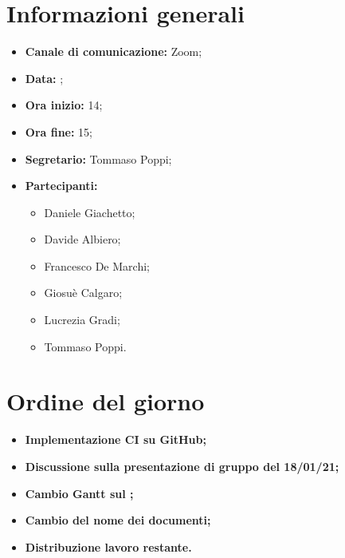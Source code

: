 \section{Informazioni generali}

\begin{itemize}

	\item \textbf{Canale di comunicazione:} Zoom;
	
	\item \textbf{Data:} \DataMeeting{};
	
	\item \textbf{Ora inizio:} 14;
	
	\item \textbf{Ora fine:} 15;
	
	\item \textbf{Segretario:} Tommaso Poppi;
	
	\item \textbf{Partecipanti:}
	
		\begin{itemize}
		
			\item Daniele Giachetto;
			\item Davide Albiero;
			\item Francesco De Marchi;
			\item Giosuè Calgaro;
			\item Lucrezia Gradi;
			\item Tommaso Poppi.
				 
		\end{itemize}

\end{itemize}



\section{Ordine del giorno}

\begin{itemize}

	\item\textbf{Implementazione CI su GitHub;}
	
	\item\textbf{Discussione sulla presentazione di gruppo del 18/01/21;}

	\item\textbf{Cambio Gantt sul \PdP{};}

	\item\textbf{Cambio del nome dei documenti;}
	
	\item\textbf{Distribuzione lavoro restante.}

\end{itemize}

